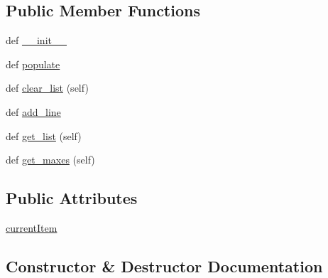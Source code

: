 \subsection*{Public Member Functions}
\begin{DoxyCompactItemize}
\item 
def \hyperlink{class_uni_dec_1_1datacollector_1_1_x_value_list_ctrl_acecbae2697318cc8897d4921381b947e}{\+\_\+\+\_\+init\+\_\+\+\_\+}
\item 
def \hyperlink{class_uni_dec_1_1datacollector_1_1_x_value_list_ctrl_a8abc7ad7d7eeffbc8a9e547fd1ed4929}{populate}
\item 
def \hyperlink{class_uni_dec_1_1datacollector_1_1_x_value_list_ctrl_a5480333c68b86924e054ca998eeb2969}{clear\+\_\+list} (self)
\item 
def \hyperlink{class_uni_dec_1_1datacollector_1_1_x_value_list_ctrl_a461e5e2cb54c217b9b11b5240f83b529}{add\+\_\+line}
\item 
def \hyperlink{class_uni_dec_1_1datacollector_1_1_x_value_list_ctrl_a118d81ee416f1a3299c223f815f95547}{get\+\_\+list} (self)
\item 
def \hyperlink{class_uni_dec_1_1datacollector_1_1_x_value_list_ctrl_a11a3a503b5eaf56f07fffde67366fc2b}{get\+\_\+maxes} (self)
\end{DoxyCompactItemize}
\subsection*{Public Attributes}
\begin{DoxyCompactItemize}
\item 
\hyperlink{class_uni_dec_1_1datacollector_1_1_x_value_list_ctrl_a0587c575cda074158dfe2555b89d43d0}{current\+Item}
\end{DoxyCompactItemize}


\subsection{Constructor \& Destructor Documentation}
\hypertarget{class_uni_dec_1_1datacollector_1_1_x_value_list_ctrl_acecbae2697318cc8897d4921381b947e}{}
